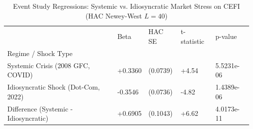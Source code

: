 \begin{table}
\caption{Event Study Regressions: Systemic vs. Idiosyncratic Market Stress on CEFI (HAC Newey-West $L=40$)}
\label{tab:event_study}
\begin{tabular}{lllll}
\toprule
 & Beta & HAC SE & t-statistic & p-value \\
Regime / Shock Type &  &  &  &  \\
\midrule
Systemic Crisis (2008 GFC, COVID) & +0.3360 & (0.0739) & +4.54 & 5.5231e-06 \\
Idiosyncratic Shock (Dot-Com, 2022) & -0.3546 & (0.0736) & -4.82 & 1.4389e-06 \\
Difference (Systemic - Idiosyncratic) & +0.6905 & (0.1043) & +6.62 & 4.0173e-11 \\
\bottomrule
\end{tabular}
\end{table}

